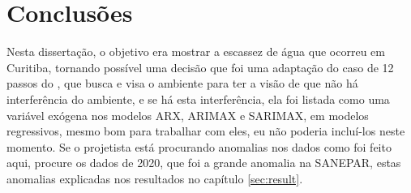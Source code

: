 \section{Conclus\~oes} \label{sec:conclusoes}

Nesta dissertação, o objetivo era mostrar a escassez de água que ocorreu em Curitiba, tornando possível uma decisão que foi uma adaptação do caso de 12 passos do , que busca e visa o ambiente para ter a visão de que não há interferência do ambiente, e se há esta interferência, ela foi listada como uma variável exógena nos modelos ARX, ARIMAX e SARIMAX, em modelos regressivos, mesmo bom para trabalhar com eles, eu não poderia incluí-los neste momento.  Se o projetista está procurando anomalias nos dados como foi feito aqui, procure os dados de 2020, que foi a grande anomalia na SANEPAR, estas anomalias explicadas nos resultados no capítulo \ref{sec:result}. 




